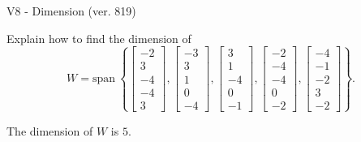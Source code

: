 \begin{exercise}
  \begin{exerciseTitle}V8 - Dimension (ver. 819)\end{exerciseTitle}
  \begin{exerciseStatement}
    Explain how to find the dimension of 
\[W=\mathrm{span}\ \left\{\left[\begin{array}{r}
-2 \\
3 \\
-4 \\
-4 \\
3
\end{array}\right] , \left[\begin{array}{r}
-3 \\
3 \\
1 \\
0 \\
-4
\end{array}\right] , \left[\begin{array}{r}
3 \\
1 \\
-4 \\
0 \\
-1
\end{array}\right] , \left[\begin{array}{r}
-2 \\
-4 \\
-4 \\
0 \\
-2
\end{array}\right] , \left[\begin{array}{r}
-4 \\
-1 \\
-2 \\
3 \\
-2
\end{array}\right]\right\}.\]



  \end{exerciseStatement}
  \begin{exerciseAnswer}
   The dimension of \(W\) is  \(5\).
  


  \end{exerciseAnswer}
\end{exercise}